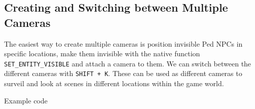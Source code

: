 \documentclass[
  openany]{book}
\begin{document}
\hypertarget{creating-and-switching-between-multiple-cameras}{%
\subsection*{Creating and Switching between Multiple Cameras}\label{creating-and-switching-between-multiple-cameras}}

The easiest way to create multiple cameras is position invisible Ped NPCs in specific locations, make them invisible with the native function \texttt{SET\_ENTITY\_VISIBLE} and attach a camera to them. We can switch between the different cameras with \texttt{SHIFT\ +\ K}. These can be used as different cameras to surveil and look at scenes in different locations within the game world.

Example code
\end{document}
